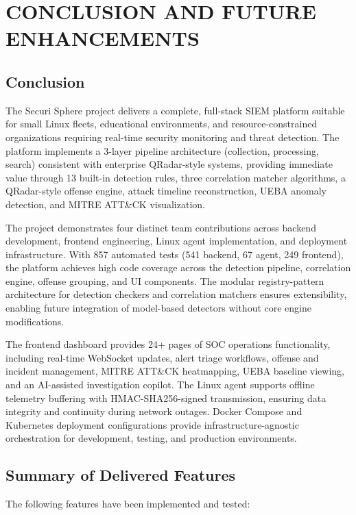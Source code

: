 \chapter{CONCLUSION AND FUTURE ENHANCEMENTS}

\section{Conclusion}

The Securi Sphere project delivers a complete, full-stack SIEM platform suitable for small Linux fleets, educational environments, and resource-constrained organizations requiring real-time security monitoring and threat detection. The platform implements a 3-layer pipeline architecture (collection, processing, search) consistent with enterprise QRadar-style systems, providing immediate value through 13 built-in detection rules, three correlation matcher algorithms, a QRadar-style offense engine, attack timeline reconstruction, UEBA anomaly detection, and MITRE ATT\&CK visualization.

The project demonstrates four distinct team contributions across backend development, frontend engineering, Linux agent implementation, and deployment infrastructure. With 857 automated tests (541 backend, 67 agent, 249 frontend), the platform achieves high code coverage across the detection pipeline, correlation engine, offense grouping, and UI components. The modular registry-pattern architecture for detection checkers and correlation matchers ensures extensibility, enabling future integration of model-based detectors without core engine modifications.

The frontend dashboard provides 24+ pages of SOC operations functionality, including real-time WebSocket updates, alert triage workflows, offense and incident management, MITRE ATT\&CK heatmapping, UEBA baseline viewing, and an AI-assisted investigation copilot. The Linux agent supports offline telemetry buffering with HMAC-SHA256-signed transmission, ensuring data integrity and continuity during network outages. Docker Compose and Kubernetes deployment configurations provide infrastructure-agnostic orchestration for development, testing, and production environments.

\section{Summary of Delivered Features}

The following features have been implemented and tested:

